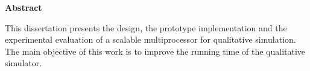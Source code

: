 \newpage
\vspace*{1.5 cm}
\Large
\noindent
{\bf Abstract} \\
\vspace*{0.1 cm}
\normalsize

\noindent
This dissertation presents the design, the prototype implementation and the
experimental evaluation of a scalable multiprocessor for qualitative
simulation. The main objective of this work is to improve the running time of
the qualitative simulator.
